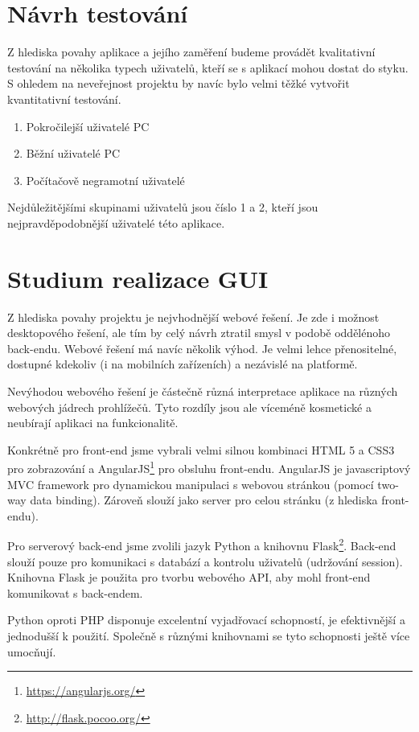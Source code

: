 \documentclass[11pt,a4paper]{article}
\begin{document}

\section*{Návrh testování}
Z hlediska povahy aplikace a jejího zaměření budeme provádět kvalitativní testování na několika typech uživatelů, kteří se s aplikací mohou dostat do styku. S ohledem na neveřejnost projektu by navíc bylo velmi těžké vytvořit kvantitativní testování.
\begin{enumerate}
	\item{Pokročilejší uživatelé PC}
	\item{Běžní uživatelé PC}
	\item{Počítačově negramotní uživatelé}
\end{enumerate}

Nejdůležitějšími skupinami uživatelů jsou číslo 1 a 2, kteří jsou nejpravděpodobnější uživatelé této aplikace. 

\section*{Studium realizace GUI}
Z hlediska povahy projektu je nejvhodnější webové řešení. Je zde i možnost desktopového řešení, ale tím by celý návrh ztratil smysl v podobě oddělénoho back-endu. Webové řešení má navíc několik výhod. Je velmi lehce přenositelné, dostupné kdekoliv (i na mobilních zařízeních) a nezávislé na platformě.

Nevýhodou webového řešení je částečně různá interpretace aplikace na různých webových jádrech prohlížečů. Tyto rozdíly jsou ale víceméně kosmetické a neubírají aplikaci na funkcionalitě.

Konkrétně pro front-end jsme vybrali velmi silnou kombinaci HTML 5 a CSS3 pro zobrazování a AngularJS\footnote{\url{https://angularjs.org/}} pro obsluhu front-endu. AngularJS je javascriptový MVC framework pro dynamickou manipulaci s webovou stránkou (pomocí two-way data binding). Zároveň slouží jako server pro celou stránku (z hlediska front-endu).

Pro serverový back-end jsme zvolili jazyk Python a knihovnu Flask\footnote{\url{http://flask.pocoo.org/}}. Back-end slouží pouze pro komunikaci s databází a kontrolu uživatelů (udržování session). Knihovna Flask je použita pro tvorbu webového API, aby mohl front-end komunikovat s back-endem. 

Python oproti PHP disponuje excelentní vyjadřovací schopností, je efektivnější a jednodušší k použití. Společně s různými knihovnami se tyto schopnosti ještě více umocňují.
\end{document}

